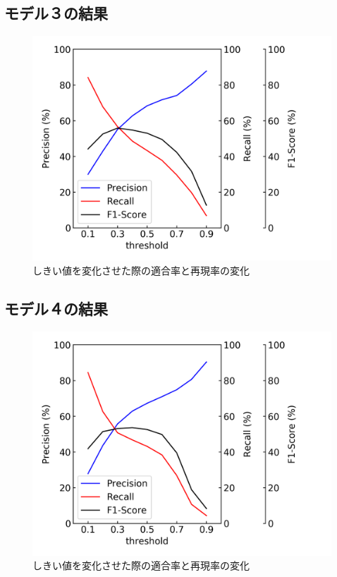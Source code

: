 \subsection{モデル３の結果}
\begin{figure}[htbp]
    \begin{center}
        \includegraphics[width=150mm]{./fig/resnet3d_mthreshold.png}
        \caption{しきい値を変化させた際の適合率と再現率の変化}
        \label{fig:resnet3d_m_result_threshold}
    \end{center}
\end{figure}

\newpage
\subsection{モデル４の結果}
\begin{figure}[htbp]
    \begin{center}
        \includegraphics[width=150mm]{./fig/resnet3d_e_mthreshold.png}
        \caption{しきい値を変化させた際の適合率と再現率の変化}
        \label{fig:resnet3d_e_m_result_threshold}
    \end{center}
\end{figure}

